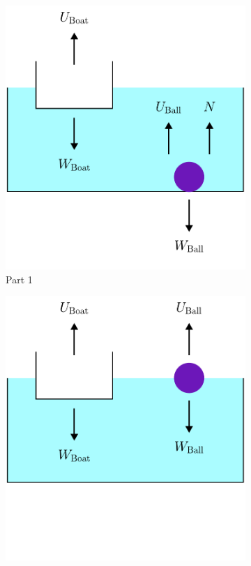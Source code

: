 \begin{figure}[H]
    \centering
    \begin{subfigure}{0.49\textwidth}
        \includegraphics[width=\textwidth]{5 - Physics/TheBallAndTheBoat_Case1.pdf}
        \caption{Part 1}
        \label{fig:TheBallAndTheBoat_Case1}
    \end{subfigure}
    \hfill
    \begin{subfigure}{0.49\textwidth}
        \includegraphics[width=\textwidth]{5 - Physics/TheBallAndTheBoat_Case2.pdf}

\end{subfigure}
\end{figure}

